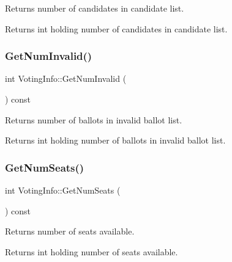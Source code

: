 Returns number of candidates in candidate list. 

\begin{DoxyReturn}{Returns}
int holding number of candidates in candidate list. 
\end{DoxyReturn}
\mbox{\label{classVotingInfo_ab228e2f9415e099d0d38c2194309e3c6}} 
\subsubsection{\texorpdfstring{Get\+Num\+Invalid()}{GetNumInvalid()}}
{\footnotesize\ttfamily int Voting\+Info\+::\+Get\+Num\+Invalid (\begin{DoxyParamCaption}{ }\end{DoxyParamCaption}) const}



Returns number of ballots in invalid ballot list. 

\begin{DoxyReturn}{Returns}
int holding number of ballots in invalid ballot list. 
\end{DoxyReturn}
\mbox{\label{classVotingInfo_a9c226e3b169e0228ab26cb0a251792bd}} 
\subsubsection{\texorpdfstring{Get\+Num\+Seats()}{GetNumSeats()}}
{\footnotesize\ttfamily int Voting\+Info\+::\+Get\+Num\+Seats (\begin{DoxyParamCaption}{ }\end{DoxyParamCaption}) const}



Returns number of seats available. 

\begin{DoxyReturn}{Returns}
int holding number of seats available. 
\end{DoxyReturn}
\mbox{\label{classVotingInfo_a16f743613daad52be36a92226001e5dd}} 
